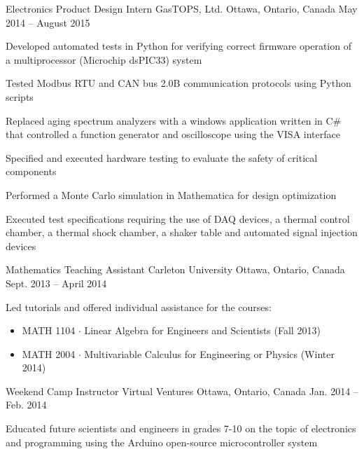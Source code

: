 \begin{cventries}
  \cventry
    {Electronics Product Design Intern} %
    {GasTOPS, Ltd.} %
    {Ottawa, Ontario, Canada} %
    {May 2014 – August 2015} %
    {
      \begin{cvitems} %
        \item {Developed automated tests in Python for verifying correct firmware operation of a multiprocessor (Microchip dsPIC33) system}
        \item {Tested Modbus RTU and CAN bus 2.0B communication protocols using Python scripts}
        \item {Replaced aging spectrum analyzers with a windows application written in C\# that controlled a function generator and oscilloscope using the VISA interface}
        \item {Specified and executed hardware testing to evaluate the safety of critical components}
        \item {Performed a Monte Carlo simulation in Mathematica for design optimization}
        \item {Executed test specifications requiring the use of DAQ devices, a thermal control chamber, a thermal shock chamber, a shaker table and automated signal injection devices}
      \end{cvitems}
    }

  \cventry
    {Mathematics Teaching Assistant} %
    {Carleton University} %
    {Ottawa, Ontario, Canada} %
    {Sept. 2013 – April 2014} %
    {
      \begin{cvitems} %
        \item {Led tutorials and offered individual assistance for the courses:}
          \begin{itemize}
            \item {MATH 1104 $\cdot$ Linear Algebra for Engineers and Scientists (Fall 2013)}
            \item {MATH 2004 $\cdot$ Multivariable Calculus for Engineering or Physics (Winter 2014)}
          \end{itemize}
      \end{cvitems}
    }

  \cventry
    {Weekend Camp Instructor} %
    {Virtual Ventures} %
    {Ottawa, Ontario, Canada} %
    {Jan. 2014 – Feb. 2014} %
    {
      \begin{cvitems} %
        \item {Educated future scientists and engineers in grades 7-10 on the topic of electronics and programming using the Arduino open-source microcontroller system}
      \end{cvitems}
    }


\end{cventries}

